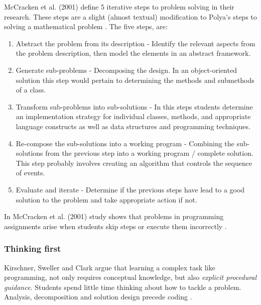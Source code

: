 McCracken et al. (2001) define 5 iterative steps to problem solving in their
research. These steps are a slight (almost textual) modification to Polya's
steps to solving a mathematical problem \cite{Polya1945}. The five steps,
are:
    \begin{enumerate}
    \item Abstract the problem from its description - Identify the relevant
        aspects from the problem description, then model the elements in an
        abstract framework.

    \item Generate sub-problems - Decomposing the design. In an
        object-oriented solution this step would pertain to determining the
        methods and submethods of a class.

    \item Transform sub-problems into sub-solutions - In this steps
        students determine an implementation strategy for individual
        classes, methods, and appropriate language constructs as well as
        data structures and programming techniques.

    \item Re-compose the sub-solutions into a working program - Combining
        the sub-solutions from the previous step into a working program /
        complete solution. This step probably involves creating an
        algorithm that controls the sequence of events.

    \item Evaluate and iterate - Determine if the previous steps have lead
        to a good solution to the problem and take appropriate action if
        not.


    \end{enumerate}



In McCracken et al. (2001) study shows that problems in programming
assignments arise when students skip steps or execute them incorrectly
\cite{McCracken2001}.



\subsubsection{Thinking first}

Kirschner, Sweller and Clark argue that learning a complex task like
programming, not only requires conceptual knowledge, but also \emph{explicit
procedural guidance}. Students spend little time thinking about how to tackle
a problem. Analysis, decomposition and solution design precede coding
\cite{natasja2014}.



